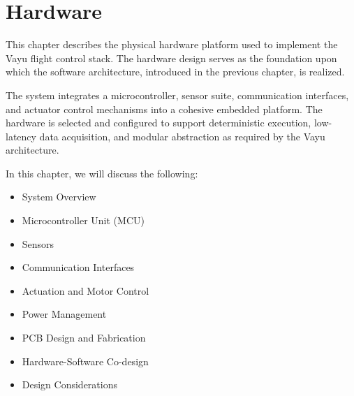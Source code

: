 \chapter{Hardware}
\label{chap:hardware}

This chapter describes the physical hardware platform used to implement the Vayu flight control stack. The hardware design serves as the foundation upon which the software architecture, introduced in the previous chapter, is realized.

The system integrates a microcontroller, sensor suite, communication interfaces, and actuator control mechanisms into a cohesive embedded platform. The hardware is selected and configured to support deterministic execution, low-latency data acquisition, and modular abstraction as required by the Vayu architecture.

In this chapter, we will discuss the following:

\begin{itemize}
    \item System Overview
    \item Microcontroller Unit (MCU)
    \item Sensors
    \item Communication Interfaces
    \item Actuation and Motor Control
    \item Power Management
    \item PCB Design and Fabrication
    \item Hardware-Software Co-design
    \item Design Considerations
\end{itemize}










